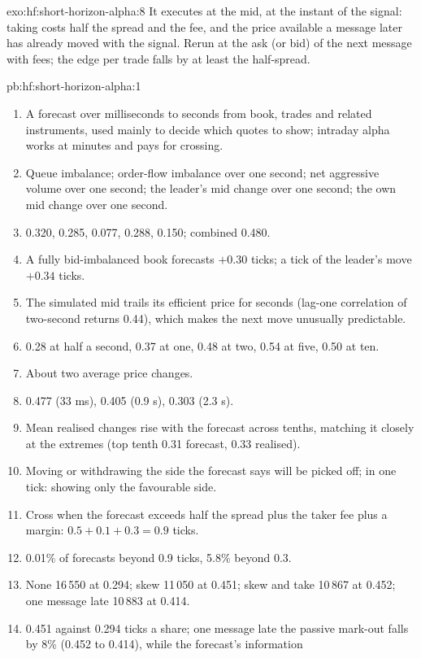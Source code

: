 \begin{solution}{exo:hf:short-horizon-alpha:8}
It executes at the mid, at the instant of the signal: taking costs half the spread and the fee, and the price available a message later has already
moved with the signal. Rerun at the ask (or bid) of the next message with fees; the edge per trade falls by at least the half-spread.
\end{solution}

\begin{solution}{pb:hf:short-horizon-alpha:1}
\begin{enumerate}
\item A forecast over milliseconds to seconds from book, trades and related instruments, used mainly to decide which quotes to show; intraday alpha
works at minutes and pays for crossing.
\item Queue imbalance; order-flow imbalance over one second; net aggressive volume over one second; the leader's mid change over one second; the own
mid change over one second.
\item 0.320, 0.285, 0.077, 0.288, 0.150; combined 0.480.
\item A fully bid-imbalanced book forecasts $+0.30$ ticks; a tick of the leader's move $+0.34$ ticks.
\item The simulated mid trails its efficient price for seconds (lag-one correlation of two-second returns 0.44), which makes the next move unusually
predictable.
\item 0.28 at half a second, 0.37 at one, 0.48 at two, 0.54 at five, 0.50 at ten.
\item About two average price changes.
\item 0.477 (33 ms), 0.405 (0.9 s), 0.303 (2.3 s).
\item Mean realised changes rise with the forecast across tenths, matching it closely at the extremes (top tenth 0.31 forecast, 0.33 realised).
\item Moving or withdrawing the side the forecast says will be picked off; in one tick: showing only the favourable side.
\item Cross when the forecast exceeds half the spread plus the taker fee plus a margin: $0.5+0.1+0.3=0.9$ ticks.
\item 0.01\% of forecasts beyond 0.9 ticks, 5.8\% beyond 0.3.
\item None 16\,550 at 0.294; skew 11\,050 at 0.451; skew and take 10\,867 at 0.452; one message late 10\,883 at 0.414.
\item 0.451 against 0.294 ticks a share; one message late the passive mark-out falls by 8\% (0.452 to 0.414), while the forecast's information

\end{enumerate}
\end{solution}
